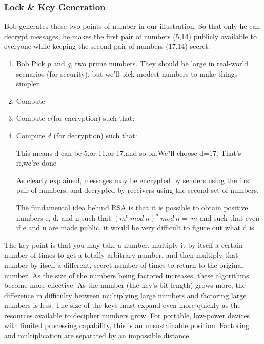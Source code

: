 \documentclass{article}
\begin{document}
\subsubsection{Lock & Key Generation}
Bob generates these two points of number in our illustration. So that only he can decrypt messages, he makes the first pair of numbers (5,14) publicly available to everyone while keeping the second pair of numbers (17,14) secret.
\begin{enumerate}
  \item Bob Pick $p$ and $q$, two prime numbers. They should be large in real-world scenarios (for security), but we'll pick modest numbers to make things simpler.
  \begin{center}
  \end{center}
  \item Compute \begin{center}
  \end{center} 
  \item Compute $e$(for encryption) such that:
  \begin{center}
  \end{center}
  \item Compute $d$ (for decryption) such that:
  \begin{center}
      \newline
      \newline
  \end{center}
  This means d can be 5,or 11,or 17,and so on.We"ll choose d=17.
  That's it,we're done
  \begin{center}
      \hspace{1.6cm}
      \newline
      \newline
  \end{center}
As clearly explained, messages may be encrypted by senders using the first pair of numbers, and decrypted by receivers using the second set of numbers.
  
  The fundamental idea behind RSA is that it is possible to obtain positive numbers e, d, and n such that \((m^{e} \:mod\: n)^d \:mod \:n = \:m\) and such that even if e and n are made public, it would be very difficult to figure out what d is
\end{enumerate}
The key point is that you may take a number, multiply it by itself a certain number of times to get a totally arbitrary number, and then multiply that number by itself a different, secret number of times to return to the original number.
As the size of the numbers being factored increases, these algorithms become more effective.
As the number (the key's bit length) grows more, the difference in difficulty between multiplying large numbers and factoring large numbers is less.
The size of the keys must expand even more quickly as the resources available to decipher numbers grow.
For portable, low-power devices with limited processing capability, this is an unsustainable position.
Factoring and multiplication are separated by an impossible distance.
\end{document}
